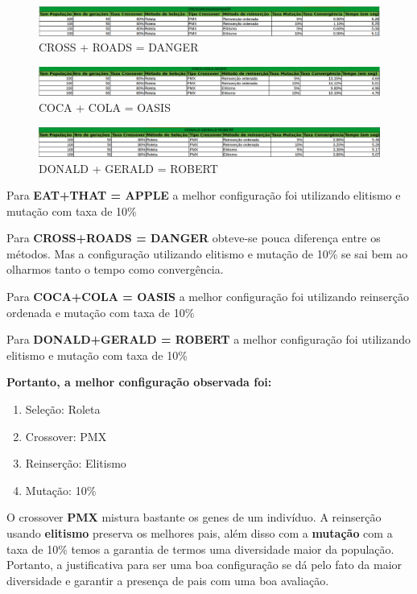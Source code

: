 \documentclass[hidelinks,12pt]{article}
\begin{document}
		\begin{figure}[h!]
		\centering
		\includegraphics[scale=0.42]{Figures/crossroadsdanger}
		\caption{CROSS + ROADS = DANGER}
		\end{figure}
	
		\begin{figure}[h!]
		\centering
		\includegraphics[scale=0.42]{Figures/cocacolaoasis}
		\caption{COCA + COLA = OASIS}
		\end{figure}
		\begin{figure}[h!]
		\centering
		\includegraphics[scale=0.42]{Figures/donaldgeraldrobert}
		\caption{DONALD + GERALD = ROBERT}
		\end{figure}
		
		Para {\bf EAT+THAT = APPLE} a melhor configuração foi utilizando elitismo e mutação com taxa de 10\%
		
		
		Para {\bf CROSS+ROADS = DANGER } obteve-se pouca diferença entre os métodos. Mas a configuração utilizando elitismo e mutação de 10\% se sai bem ao olharmos tanto o tempo como convergência.
		
		
		Para {\bf COCA+COLA = OASIS} a melhor configuração foi utilizando reinserção ordenada e mutação com taxa de 10\%	
			
		
		Para {\bf DONALD+GERALD = ROBERT} a melhor configuração foi utilizando elitismo e mutação com taxa de 10\%
		
		
		\newpage
		{\bf Portanto, a melhor configuração observada foi:}
		\begin{enumerate}		
		\item Seleção: Roleta
		\item Crossover: PMX
		\item Reinserção: Elitismo
		\item Mutação: 10\%
		\end{enumerate}
		
		O crossover {\bf PMX} mistura bastante os genes de um indivíduo. A reinserção usando {\bf elitismo} preserva os melhores pais, além disso com a {\bf mutação} com a taxa de 10\% temos a garantia de termos uma diversidade maior da população. Portanto, a justificativa para ser uma boa configuração se dá pelo fato da maior diversidade e garantir a presença de pais com uma boa avaliação.
		
\end{document}
